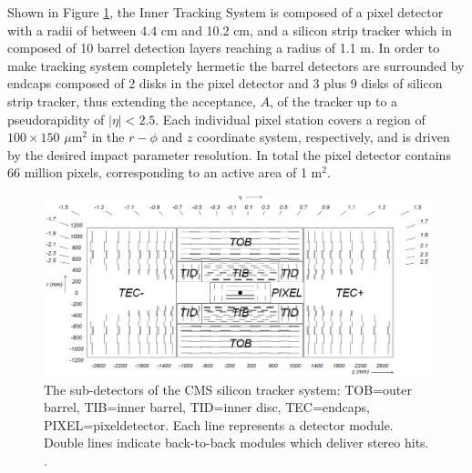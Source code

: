 Shown in Figure \ref{fig-Tracker}, the Inner Tracking System is composed of a pixel detector with a radii of between 4.4 cm and 10.2 cm, and a silicon strip tracker which in composed of 10 barrel detection layers reaching a radius of 1.1 m. In order to make tracking system completely hermetic the barrel detectors are surrounded by endcaps composed of 2 disks in the pixel detector and 3 plus 9 disks of silicon strip tracker, thus extending the acceptance, $A$, of the tracker up to a pseudorapidity of $|\eta| < 2.5$.  Each individual pixel station covers a region of $100\times150$ $\mu$m$^2$ in the $r-\phi$ and $z$ coordinate system, respectively, and is driven by the desired impact parameter resolution. In total the pixel detector contains 66 million pixels, corresponding to an active area of 1 m$^2$.

\begin{figure} [h!] \label{fig-Tracker}
\includegraphics[width=\textwidth]{Figures/Tracker.png}
\caption{The sub-detectors of the CMS silicon tracker system: TOB=outer barrel, TIB=inner barrel, TID=inner disc, TEC=endcaps, PIXEL=pixeldetector. Each line represents a detector module. Double lines indicate back-to-back modules which deliver stereo hits. \cite{CMSexperiment}.}
\end{figure}

